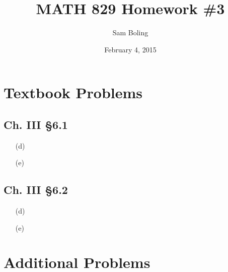 \documentclass{article}
\title{MATH 829 Homework \#3}
\date{February 4, 2015}
\author{Sam Boling}
\newcounter{Problem}
\begin{document}
\begin{titlepage}
\maketitle
\end{titlepage}

\section{Textbook Problems}

\subsection*{Ch. III \S 6.1}
\begin{itemize}
  \item[(d)]{
  }
  \item[(e)]{
  }
\end{itemize}

\subsection*{Ch. III \S 6.2}
\begin{itemize}
  \item[(d)]{
  }
  \item[(e)]{
  }
\end{itemize}


\section{Additional Problems}
\end{document}
